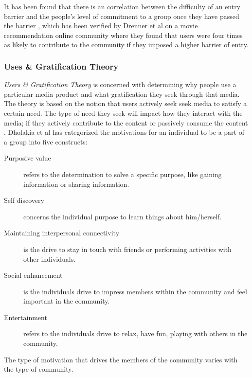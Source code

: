 It has been found that there is an correlation between the difficulty of an entry barrier and the people's level of commitment to a group once they have passed the barrier \cite{Aronson1959}, which has been verified by Drenner et al \cite{Drenner2008} on a movie recommendation online community where they found that users were four times as likely to contribute to the community if they imposed a higher barrier of entry.


\subsubsection{Uses \& Gratification Theory}
\textit{Users \& Gratification Theory} is concerned with determining why people use a particular media product and what gratification they seek through that media. The theory is based on the notion that users actively seek seek media to satisfy a certain need. The type of need they seek will impact how they interact with the media; if they actively contribute to the content or passively consume the content \cite{Rafaeli2004}. Dholakia et al \cite{Dholakia2004} has categorized the motivations for an individual to be a part of a group into five constructs:

\begin{description}
  \item[Purposive value] refers to the determination to solve a specific purpose, like gaining information or sharing information.
  \item[Self discovery] concerns the individual purpose to learn things about him/herself.
  \item[Maintaining interpersonal connectivity] is the drive to stay in touch with friends or performing activities with other individuals.
  \item[Social enhancement] is the individuals drive to impress members within the community and feel important in the community.
  \item[Entertainment] refers to the individuals drive to relax, have fun, playing with others in the community.
\end{description}

The type of motivation that drives the members of the community varies with the type of community.

